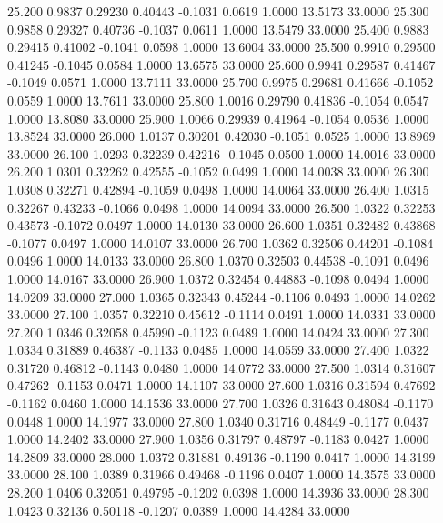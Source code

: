   25.200   0.9837   0.29230   0.40443  -0.1031   0.0619   1.0000  13.5173  33.0000
  25.300   0.9858   0.29327   0.40736  -0.1037   0.0611   1.0000  13.5479  33.0000
  25.400   0.9883   0.29415   0.41002  -0.1041   0.0598   1.0000  13.6004  33.0000
  25.500   0.9910   0.29500   0.41245  -0.1045   0.0584   1.0000  13.6575  33.0000
  25.600   0.9941   0.29587   0.41467  -0.1049   0.0571   1.0000  13.7111  33.0000
  25.700   0.9975   0.29681   0.41666  -0.1052   0.0559   1.0000  13.7611  33.0000
  25.800   1.0016   0.29790   0.41836  -0.1054   0.0547   1.0000  13.8080  33.0000
  25.900   1.0066   0.29939   0.41964  -0.1054   0.0536   1.0000  13.8524  33.0000
  26.000   1.0137   0.30201   0.42030  -0.1051   0.0525   1.0000  13.8969  33.0000
  26.100   1.0293   0.32239   0.42216  -0.1045   0.0500   1.0000  14.0016  33.0000
  26.200   1.0301   0.32262   0.42555  -0.1052   0.0499   1.0000  14.0038  33.0000
  26.300   1.0308   0.32271   0.42894  -0.1059   0.0498   1.0000  14.0064  33.0000
  26.400   1.0315   0.32267   0.43233  -0.1066   0.0498   1.0000  14.0094  33.0000
  26.500   1.0322   0.32253   0.43573  -0.1072   0.0497   1.0000  14.0130  33.0000
  26.600   1.0351   0.32482   0.43868  -0.1077   0.0497   1.0000  14.0107  33.0000
  26.700   1.0362   0.32506   0.44201  -0.1084   0.0496   1.0000  14.0133  33.0000
  26.800   1.0370   0.32503   0.44538  -0.1091   0.0496   1.0000  14.0167  33.0000
  26.900   1.0372   0.32454   0.44883  -0.1098   0.0494   1.0000  14.0209  33.0000
  27.000   1.0365   0.32343   0.45244  -0.1106   0.0493   1.0000  14.0262  33.0000
  27.100   1.0357   0.32210   0.45612  -0.1114   0.0491   1.0000  14.0331  33.0000
  27.200   1.0346   0.32058   0.45990  -0.1123   0.0489   1.0000  14.0424  33.0000
  27.300   1.0334   0.31889   0.46387  -0.1133   0.0485   1.0000  14.0559  33.0000
  27.400   1.0322   0.31720   0.46812  -0.1143   0.0480   1.0000  14.0772  33.0000
  27.500   1.0314   0.31607   0.47262  -0.1153   0.0471   1.0000  14.1107  33.0000
  27.600   1.0316   0.31594   0.47692  -0.1162   0.0460   1.0000  14.1536  33.0000
  27.700   1.0326   0.31643   0.48084  -0.1170   0.0448   1.0000  14.1977  33.0000
  27.800   1.0340   0.31716   0.48449  -0.1177   0.0437   1.0000  14.2402  33.0000
  27.900   1.0356   0.31797   0.48797  -0.1183   0.0427   1.0000  14.2809  33.0000
  28.000   1.0372   0.31881   0.49136  -0.1190   0.0417   1.0000  14.3199  33.0000
  28.100   1.0389   0.31966   0.49468  -0.1196   0.0407   1.0000  14.3575  33.0000
  28.200   1.0406   0.32051   0.49795  -0.1202   0.0398   1.0000  14.3936  33.0000
  28.300   1.0423   0.32136   0.50118  -0.1207   0.0389   1.0000  14.4284  33.0000

